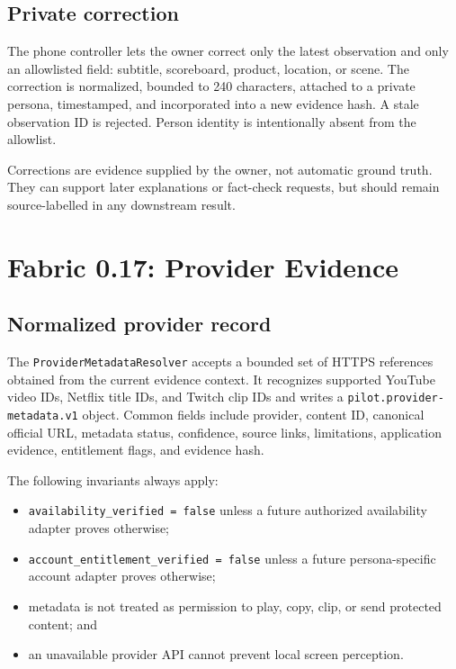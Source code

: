 \documentclass[11pt,a4paper]{article}
\begin{document}
\subsection{Private correction}

The phone controller lets the owner correct only the latest observation and
only an allowlisted field: subtitle, scoreboard, product, location, or scene.
The correction is normalized, bounded to 240 characters, attached to a private
persona, timestamped, and incorporated into a new evidence hash.  A stale
observation ID is rejected.  Person identity is intentionally absent from the
allowlist.

Corrections are evidence supplied by the owner, not automatic ground truth.
They can support later explanations or fact-check requests, but should remain
source-labelled in any downstream result.

\section{Fabric 0.17: Provider Evidence}

\subsection{Normalized provider record}

The \texttt{ProviderMetadataResolver} accepts a bounded set of HTTPS references
obtained from the current evidence context.  It recognizes supported YouTube
video IDs, Netflix title IDs, and Twitch clip IDs and writes a
\texttt{pilot.provider-metadata.v1} object.  Common fields include provider,
content ID, canonical official URL, metadata status, confidence, source links,
limitations, application evidence, entitlement flags, and evidence hash.

The following invariants always apply:

\begin{itemize}[leftmargin=*]
  \item \texttt{availability\_verified = false} unless a future authorized
        availability adapter proves otherwise;
  \item \texttt{account\_entitlement\_verified = false} unless a future
        persona-specific account adapter proves otherwise;
  \item metadata is not treated as permission to play, copy, clip, or send
        protected content; and
  \item an unavailable provider API cannot prevent local screen perception.
\end{itemize}
\end{document}
